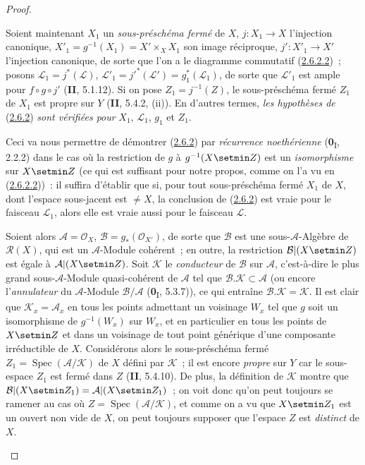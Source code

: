 \begin{proof}
\begin{env}[2.6.2.3]
\label{III.2.6.2.3-fr}
Soient maintenant $X_1$ un \emph{sous-préschéma fermé} de $X$,
$j:X_1\to X$ l'injection canonique,
$X'_1=g^{-1}(X_1)=X'\times_X X_1$ son image réciproque,
$j':X'_1\to X'$ l'injection canonique, de sorte que l'on a le diagramme
commutatif (\hyperref[III.2.6.2.2-fr]{2.6.2.2})~; posons
$\mathcal L_1=j^*(\mathcal L)$,
$\mathcal L'_1=j'^*(\mathcal L')=g_1^*(\mathcal L_1)$, de sorte que
$\mathcal L'_1$ est ample pour $f\circ g\circ j'$ (\textbf{II}, 5.1.12). Si on
pose $Z_1=j^{-1}(Z)$, le sous-préschéma fermé $Z_1$ de $X_1$ est propre
sur $Y$ (\textbf{II}, 5.4.2, (ii)). En d'autres termes, \emph{les hypothèses de}
(\hyperref[III.2.6.2-fr]{2.6.2}) \emph{sont vérifiées pour} $X_1$,
$\mathcal L_1$, $g_1$ et $Z_1$.
\end{env}

Ceci va nous permettre de démontrer
(\hyperref[III.2.6.2-fr]{2.6.2}) par \emph{récurrence noethérienne}
(\textbf{0}\textsubscript{I}, 2.2.2) dans le cas où la restriction de $g$ à
$g^{-1}(X\setmin Z)$ est un \emph{isomorphisme} sur $X\setmin Z$ (ce qui est suffisant pour
notre propos, comme on l'a vu en
(\hyperref[III.2.6.2.2-fr]{2.6.2.2}))~: il suffira d'établir que si, pour
tout sous-préschéma fermé $X_1$ de $X$, dont l'espace sous-jacent est
$\neq X$, la conclusion de (\hyperref[III.2.6.2-fr]{2.6.2}) est vraie
pour le faisceau $\mathcal L_1$, alors elle est vraie aussi pour le
faisceau $\mathcal L$.

\begin{env}[2.6.2.4]
\label{III.2.6.2.4-fr}
Soient alors $\mathcal A=\mathcal O_X$, $\mathcal B=g_*(\mathcal O_{X'})$,
de sorte que $\mathcal B$ est une sous-$\mathcal A$-Algèbre de
$\mathcal R(X)$, qui est un $\mathcal A$-Module cohérent~; en outre, la
restriction $\mathcal B|(X\setmin Z)$ est égale à $\mathcal A|(X\setmin Z)$. Soit
$\mathcal K$ le \emph{conducteur} de $\mathcal B$ sur $\mathcal A$, c'est-à-dire
le plus grand sous-$\mathcal A$-Module quasi-cohérent de $\mathcal A$ tel
que $\mathcal B.\mathcal K\subset\mathcal A$ (ou encore l'\emph{annulateur} du
$\mathcal A$-Module $\mathcal B/\mathcal A$
(\textbf{0}\textsubscript{I}, 5.3.7)), ce qui entraîne
$\mathcal B.\mathcal K=\mathcal K$. Il est clair que
$\mathcal K_x=\mathcal A_x$ en tous les points admettant un voisinage
$W_x$ tel que $g$ soit un isomorphisme de $g^{-1}(W_x)$ sur $W_x$, et en
particulier en tous les points de $X\setmin Z$ et dans un voisinage de tout
point générique d'une composante irréductible de $X$. Considérons alors
le sous-préschéma fermé $Z_1=\operatorname{Spec}(\mathcal A/\mathcal K)$
de $X$ défini par $\mathcal K$~; il est encore \emph{propre} sur $Y$ car le
sous-espace $Z_1$ est fermé dans $Z$ (\textbf{II}, 5.4.10). De plus, la définition
de $\mathcal K$ montre que
$\mathcal B|(X\setmin Z_1)=\mathcal A|(X\setmin Z_1)$~; on voit donc qu'on peut toujours
se ramener au cas où
$Z=\operatorname{Spec}(\mathcal A/\mathcal K)$, et comme on a vu que
$X\setmin Z_1$ est un ouvert non vide de $X$, on peut toujours supposer que
l'espace $Z$ est \emph{distinct} de $X$.
\end{env}


\end{proof}
